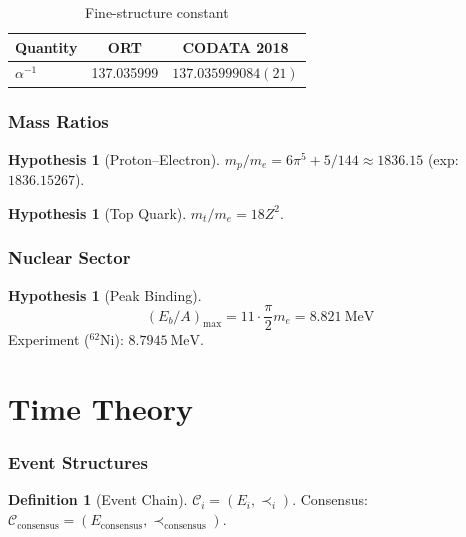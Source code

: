 \documentclass[12pt,a4paper]{article}
\numberwithin{equation}{section}
\theoremstyle{plain}
\theoremstyle{definition}
\newtheorem{definition}[theorem]{Definition}
\newtheorem{hypothesis}[theorem]{Hypothesis}
\theoremstyle{remark}
\newcommand{\Chain}{\ensuremath{\mathcal{C}}}
\newcommand{\Zed}{\ensuremath{Z}}
\begin{document}
\begin{table}[H]
\centering
\caption{Fine-structure constant}
\begin{tabular}{lcc}
\toprule
\textbf{Quantity} & \textbf{ORT} & \textbf{CODATA 2018} \\
\midrule
$\alpha^{-1}$ & 137.035999 & $137.035999084(21)$ \\
\bottomrule
\end{tabular}
\end{table}

\section{Mass Ratios}

\begin{hypothesis}[Proton--Electron]
$m_p/m_e = 6\pi^5 + 5/144 \approx 1836.15$ (exp: $1836.15267$).
\end{hypothesis}

\begin{hypothesis}[Top Quark]
$m_t/m_e = 18\Zed^2$.
\end{hypothesis}

\section{Nuclear Sector}

\begin{hypothesis}[Peak Binding]
\[
(E_b/A)_{\max} = 11 \cdot \frac{\pi}{2} m_e = \SI{8.821}{\mega\electronvolt}
\]
Experiment ($^{62}$Ni): $\SI{8.7945}{\mega\electronvolt}$.
\end{hypothesis}

\part{Time Theory}
\label{part:time}

\section{Event Structures}

\begin{definition}[Event Chain]
$\Chain_i = (E_i, \prec_i)$. Consensus: $\Chain_{\mathrm{consensus}} = (E_{\mathrm{consensus}}, \prec_{\mathrm{consensus}})$.
\end{definition}
\end{document}
